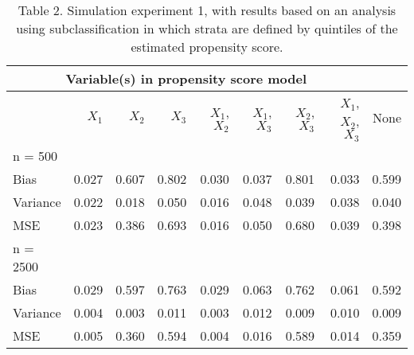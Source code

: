 \documentclass[10,a4paperpaper,]{article}
\begin{document}
\begin{table}
\caption{Table 2. Simulation experiment 1, with results based on an analysis using
subclassification in which strata are defined by quintiles of the estimated propensity
score.}
\begin{tabular}{l r r r r r r r r}
\hline
\multicolumn{8}{c}{Variable(s) in propensity score model}\\
\hline
  & $X_{1}$ & $X_{2}$ & $X_{3}$ & $X_{1}$, $X_{2}$ & $X_{1}$, $X_{3}$ & $X_{2}$, $X_{3}$ & $X_{1}$, $X_{2}$, $X_{3}$ & None\\
\hline
n = 500\\

Bias & 0.027 & 0.607 & 0.802 & 0.030 & 0.037 & 0.801 & 0.033 & 0.599\\

Variance & 0.022 & 0.018 & 0.050 & 0.016 & 0.048 & 0.039 & 0.038 & 0.040\\

MSE & 0.023 & 0.386 & 0.693 & 0.016 & 0.050 & 0.680 & 0.039 & 0.398\\

n = 2500\\

Bias & 0.029 & 0.597 & 0.763 & 0.029 & 0.063 & 0.762 & 0.061 & 0.592\\

Variance & 0.004 & 0.003 & 0.011 & 0.003 & 0.012 & 0.009 & 0.010 & 0.009\\

MSE & 0.005 & 0.360 & 0.594 & 0.004 & 0.016 & 0.589 & 0.014 & 0.359\\
\hline
\end{tabular}
\end{table}
\end{document}
